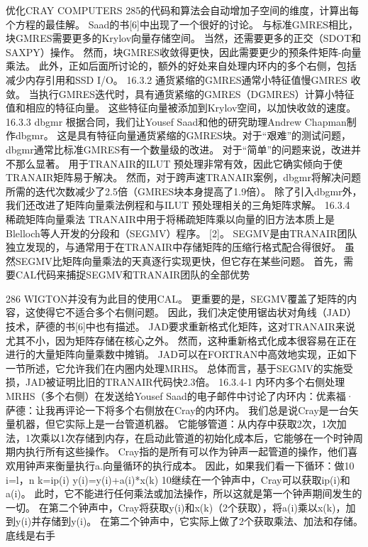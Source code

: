 \documentclass[UTF8,11pt,a4paper,openany,fontset=fandol]{ctexbook}
\begin{document}
优化CRAY COMPUTERS 285的代码和算法会自动增加子空间的维度，计算出每个方程的最佳解。 Saad的书[6]中出现了一个很好的讨论。 与标准GMRES相比，块GMRES需要更多的Krylov向量存储空间。 当然，还需要更多的正交（SDOT和SAXPY）操作。 然而，块GMRES收敛得更快，因此需要更少的预条件矩阵-向量乘法。 此外，正如后面所讨论的，额外的好处来自处理内环内的多个右侧，包括减少内存引用和SSD I/O。 16.3.2 通货紧缩的GMRES通常小特征值慢GMRES 收敛。 当执行GMRES迭代时，具有通货紧缩的GMRES（DGMRES）计算小特征值和相应的特征向量。 这些特征向量被添加到Krylov空间，以加快收敛的速度。 16.3.3 dbgmr 根据合同，我们让Yousef Saad和他的研究助理Andrew Chapman制作dbgmr。 这是具有特征向量通货紧缩的GMRES块。对于“艰难”的测试问题，dbgmr通常比标准GMRES有一个数量级的改进。 对于“简单”的问题来说，改进并不那么显著。 用于TRANAIR的ILUT 预处理非常有效，因此它确实倾向于使TRANAIR矩阵易于解决。 然而，对于跨声速TRANAIR案例，dbgmr将解决问题所需的迭代次数减少了2.5倍（GMRES块本身提高了1.9倍）。 除了引入dbgmr外，我们还改进了矩阵向量乘法例程和与ILUT 预处理相关的三角矩阵求解。 16.3.4 稀疏矩阵向量乘法 TRANAIR中用于将稀疏矩阵乘以向量的旧方法本质上是Blelloch等人开发的分段和（SEGMV）程序。 [2]。 SEGMV是由TRANAIR团队独立发现的，与通常用于在TRANAIR中存储矩阵的压缩行格式配合得很好。 虽然SEGMV比矩阵向量乘法的天真逐行实现更快，但它存在某些问题。 首先，需要CAL代码来捕捉SEGMV和TRANAIR团队的全部优势

286 WIGTON并没有为此目的使用CAL。 更重要的是，SEGMV覆盖了矩阵的内容，这使得它不适合多个右侧问题。 因此，我们决定使用锯齿状对角线（JAD）技术，萨德的书[6]中也有描述。 JAD要求重新格式化矩阵，这对TRANAIR来说尤其不小，因为矩阵存储在核心之外。 然而，这种重新格式化成本很容易在正在进行的大量矩阵向量乘数中摊销。 JAD可以在FORTRAN中高效地实现，正如下一节所述，它允许我们在内圈内处理MRHS。 总体而言，基于SEGMV的实施受损，JAD被证明比旧的TRANAIR代码快2.3倍。 16.3.4-1 内环内多个右侧处理MRHS（多个右侧）在发送给Yousef Saad的电子邮件中讨论了内环内：优素福·萨德：让我再评论一下将多个右侧放在Cray的内环内。 我们总是说Cray是一台矢量机器，但它实际上是一台管道机器。 它能够管道：从内存中获取2次，1次加法，1次乘以1次存储到内存，在启动此管道的初始化成本后，它能够在一个时钟周期内执行所有这些操作。 Cray指的是所有可以作为钟声一起管道的操作，他们喜欢用钟声来衡量执行a.向量循环的执行成本。 因此，如果我们看一下循环：做10 i=l，n k=ip(i) y(i)=y(i)+a(i)*x(k) 10继续在一个钟声中，Cray可以获取ip(i)和a(i)。 此时，它不能进行任何乘法或加法操作，所以这就是第一个钟声期间发生的一切。 在第二个钟声中，Cray将获取y(i)和x(k)（2个获取），将a(i)乘以x(k)，加到y(i)并存储到y(i)。 在第二个钟声中，它实际上做了2个获取乘法、加法和存储。 底线是右手
\end{document}
